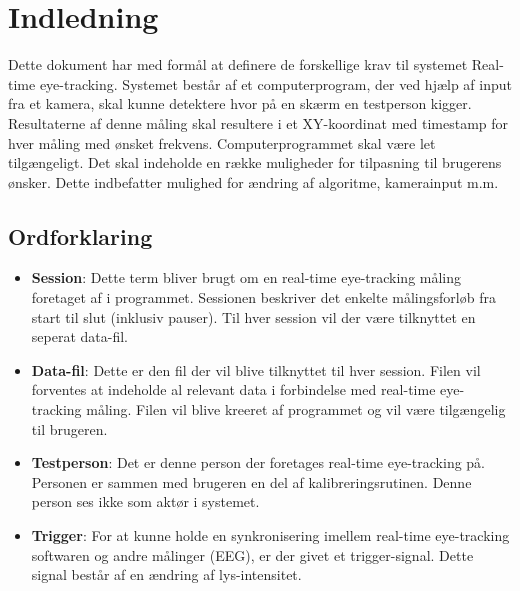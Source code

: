 \documentclass[kravspec.tex]{subfiles}
\begin{document}
	
\section{Indledning}
Dette dokument har med formål at definere de forskellige krav til systemet Real-time eye-tracking. 
Systemet består af et computerprogram, der ved hjælp af input fra et kamera, skal kunne detektere hvor på en skærm en testperson kigger. Resultaterne af denne måling skal resultere i et XY-koordinat med timestamp for hver måling med ønsket frekvens.
Computerprogrammet skal være let tilgængeligt. Det skal indeholde en række muligheder for tilpasning til brugerens ønsker. Dette indbefatter mulighed for ændring af algoritme, kamerainput m.m. 

\subsection{Ordforklaring}
\begin{itemize}
	\item \textbf{Session}: Dette term bliver brugt om en real-time eye-tracking måling foretaget af i programmet. Sessionen beskriver det enkelte målingsforløb fra start til slut (inklusiv pauser). Til hver session vil der være tilknyttet en seperat data-fil. 
	\item \textbf{Data-fil}: Dette er den fil der vil blive tilknyttet til hver session. Filen vil forventes at indeholde al relevant data i forbindelse med real-time eye-tracking måling. Filen vil blive kreeret af programmet og vil være tilgængelig til brugeren. 
	\item \textbf{Testperson}: Det er denne person der foretages real-time eye-tracking på. Personen er sammen med brugeren en del af kalibreringsrutinen. Denne person ses ikke som aktør i systemet. 
	\item \textbf{Trigger}: For at kunne holde en synkronisering imellem real-time eye-tracking softwaren og andre målinger (EEG), er der givet et trigger-signal. Dette signal består af en ændring af lys-intensitet. 
\end{itemize} 
\end{document}
